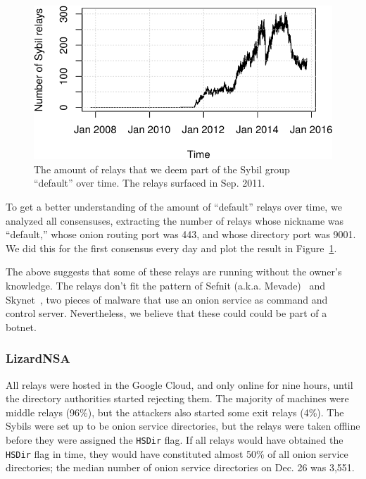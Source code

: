 \begin{figure}[t]
	\centering
	\includegraphics[width=\linewidth]{diagrams/default-over-time}
	\caption{The amount of relays that we deem part of the Sybil group
	``default'' over time.  The relays surfaced in Sep. 2011.}
	\label{fig:default-over-time}
\end{figure}

To get a better understanding of the amount of ``default'' relays over time, we
analyzed all consensuses, extracting the number of relays whose nickname was
``default,'' whose onion routing port was 443, and whose directory port was
9001.  We did this for the first consensus every day and plot the result in
Figure~\ref{fig:default-over-time}.

The above suggests that some of these relays are running without the owner's
knowledge.  The relays don't fit the pattern of Sefnit (a.k.a.
Mevade)~\cite{sefnit} and Skynet~\cite{skynet}, two pieces of malware that use
an onion service as command and control server.  Nevertheless, we believe that
these could could be part of a botnet.

\subsubsection{LizardNSA}
All relays were hosted in the Google Cloud, and only online for nine hours,
until the directory authorities started rejecting them.  The majority of
machines were middle relays (96\%), but the attackers also started some exit
relays (4\%).  The Sybils were set up to be onion service directories, but the
relays were taken offline before they were assigned the \texttt{HSDir} flag.  If
all relays would have obtained the \texttt{HSDir} flag in time, they would have
constituted almost 50\% of all onion service directories; the median number of
onion service directories on Dec. 26 was 3,551.

